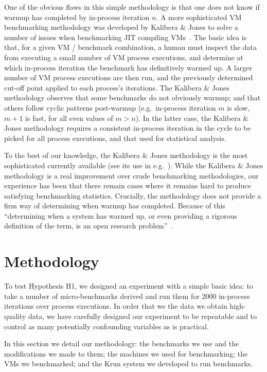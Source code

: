 \documentclass[a4paper,UKenglish]{lipics}
\newcommand{\kalibera}{Kalibera \& Jones\xspace}
\newcommand{\krun}{Krun\xspace}
\begin{document}
One of the obvious flaws in this simple methodology is that one does not know if warmup
has completed by in-process iteration $n$. A more sophisticated VM benchmarking methodology
was developed by \kalibera to solve a number of issues when benchmarking JIT
compiling VMs~\cite{kalibera12quantifying,kalibera13rigorous}. The basic idea is
that, for a given VM / benchmark combination, a human must inspect the data from
executing a small number of VM process executions, and determine at which in-process iteration the
benchmark has definitively warmed up. A larger number of VM process executions are then
run, and the previously determined cut-off point applied to each process's
iterations. The \kalibera methodology observes that some benchmarks do not
obviously warmup; and that others follow cyclic patterns post-warmup
(e.g.~in-process iteration $m$ is slow, $m+1$ is fast, for all even values of $m > n$). In
the latter case, the \kalibera methodology requires a consistent in-process iteration in
the cycle to be picked for all process executions, and that used for statistical analysis.

To the best of our knowledge, the \kalibera methodology is the most
sophisticated currently available (see its use in
e.g.~\cite{barrett15approaches,grimmer15dynamically}). While the \kalibera
methodology is a real improvement over crude benchmarking methodologies,
our experience has been that there remain cases where it remains hard to produce
satisfying benchmarking statistics. Crucially, the methodology does not
provide a firm way of determining when warmup has completed. Because of this
``determining when a system has warmed up, or even providing a
rigorous definition of the term, is an open research problem''~\cite{seaton15phd}.


\section{Methodology}
\label{sec:methodology}

To test Hypothesis H1, we designed an experiment with a simple basic idea: to
take a number of micro-benchmarks derived and run them for 2000 in-process
iterations over  process executions. In order
that we the data we obtain high-quality data, we have carefully designed our
experiment to be repeatable and to control as many potentially confounding variables as
is practical.

In this section we detail our methodology: the benchmarks we use and the
modifications we made to them; the machines we used for benchmarking; the VMs we
benchmarked; and the \krun system we developed to run benchmarks.
\end{document}
